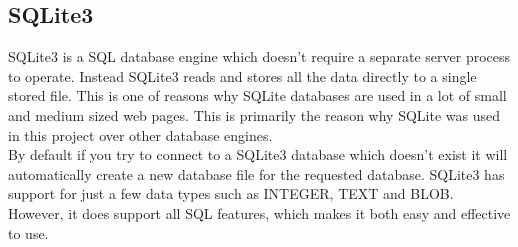 \subsection{SQLite3}
SQLite3\cite{sqlite3} is a SQL database engine which doesn't require a separate server process to operate. Instead SQLite3 reads and stores all the data directly to a single stored file. This is one of reasons why SQLite databases are used in a lot of small and medium sized web pages. This is primarily the reason why SQLite was used in this project over other database engines.
\\[11pt]
By default if you try to connect to a SQLite3 database which doesn't exist it will automatically create a new database file for the requested database. SQLite3 has support for just a few data types such as INTEGER, TEXT and BLOB. However, it does support all SQL features, which makes it both easy and effective to use.